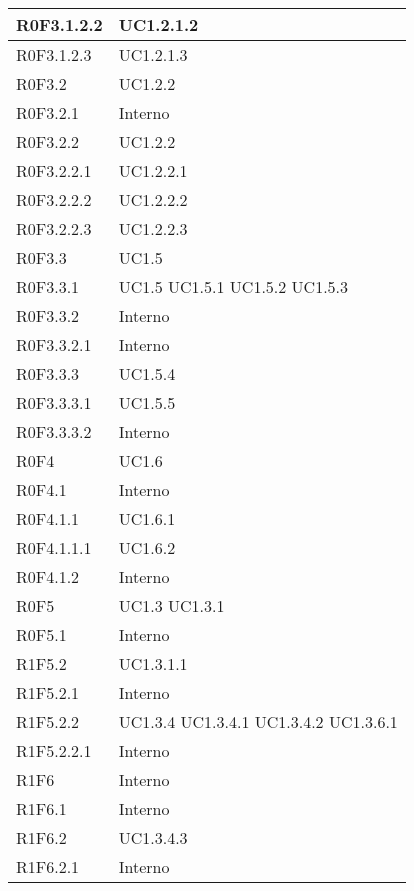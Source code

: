 \begin{center}
\begin{longtable}{| p{4cm} | p{4cm} |}
		\hline
		R0F3.1.2.2  &  UC1.2.1.2 \\
		\hline
		R0F3.1.2.3  &  UC1.2.1.3 \\
		\hline
		R0F3.2  &  UC1.2.2  \\
		\hline
		R0F3.2.1  &  Interno \\
		\hline
		R0F3.2.2  &  UC1.2.2 \\
		\hline
		R0F3.2.2.1  &  UC1.2.2.1 \\
		\hline
		R0F3.2.2.2  &  UC1.2.2.2 \\
		\hline
		R0F3.2.2.3  &  UC1.2.2.3 \\
		\hline				
		R0F3.3  &  UC1.5 \\
		\hline
		R0F3.3.1  &  UC1.5 \newline UC1.5.1 \newline UC1.5.2 \newline UC1.5.3 \\
		\hline
		R0F3.3.2  &  Interno \\
		\hline
		R0F3.3.2.1  &  Interno \\
		\hline
		R0F3.3.3  &  UC1.5.4 \\
		\hline
		R0F3.3.3.1  &  UC1.5.5 \\
		\hline
		R0F3.3.3.2  &  Interno \\
		\hline
		R0F4  &  UC1.6 \\
		\hline
		R0F4.1  &  Interno \\
		\hline
		R0F4.1.1  &  UC1.6.1 \\
		\hline
		R0F4.1.1.1  &  UC1.6.2 \\
		\hline
		R0F4.1.2  &  Interno \\
		\hline
		R0F5  &  UC1.3 \newline UC1.3.1 \\
		\hline
		R0F5.1  &  Interno \\
		\hline
		R1F5.2  &  UC1.3.1.1 \\
		\hline
		R1F5.2.1  &  Interno \\
		\hline
		R1F5.2.2  &  UC1.3.4 \newline UC1.3.4.1 \newline UC1.3.4.2 \newline UC1.3.6.1 \\
		\hline
		R1F5.2.2.1  &  Interno \\
		\hline
		R1F6  &  Interno \\
		\hline
		R1F6.1  &  Interno \\
		\hline
		R1F6.2  &  UC1.3.4.3 \\
		\hline
		R1F6.2.1  &  Interno \\

\end{longtable}
\end{center}
